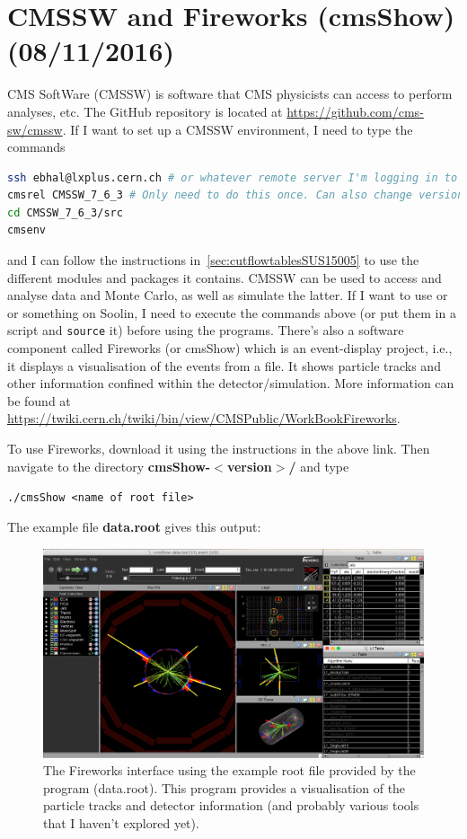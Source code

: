 
\chapter{CMSSW and Fireworks (cmsShow) (08/11/2016)}
\label{sec:fireworks}

CMS SoftWare (CMSSW) is software that CMS physicists can access to perform analyses, etc. The GitHub repository is located at \url{https://github.com/cms-sw/cmssw}. If I want to set up a CMSSW environment, I need to type the commands

\begin{lstlisting}[belowskip=-0.7cm, language=sh, numbers=none]
ssh ebhal@lxplus.cern.ch # or whatever remote server I'm logging in to
cmsrel CMSSW_7_6_3 # Only need to do this once. Can also change version I'm working with
cd CMSSW_7_6_3/src
cmsenv
\end{lstlisting}

and I can follow the instructions in~\ref{sec:cutflowtablesSUS15005} to use the different modules and packages it contains. CMSSW can be used to access and analyse data and Monte Carlo, as well as simulate the latter. If I want to use \madgraph or \madanalysis or something on Soolin, I need to execute the commands above (or put them in a script and \verb!source! it) before using the programs. There's also a software component called Fireworks (or cmsShow) which is an event-display project, i.e., it displays a visualisation of the events from a \ROOT file. It shows particle tracks and other information confined within the detector/simulation. More information can be found at \url{https://twiki.cern.ch/twiki/bin/view/CMSPublic/WorkBookFireworks}.

To use Fireworks, download it using the instructions in the above link. Then navigate to the directory \textbf{cmsShow-$<$version$>$/} and type

\verb!./cmsShow <name of root file>!

The example file \textbf{data.root} gives this output:

\begin{figure}[H]
\centering
\includegraphics[width=\textwidth]{./sec12/fireworksexample.png}
\caption{The Fireworks interface using the example root file provided by the program (data.root). This program provides a visualisation of the particle tracks and detector information (and probably various tools that I haven't explored yet).}
\end{figure}

